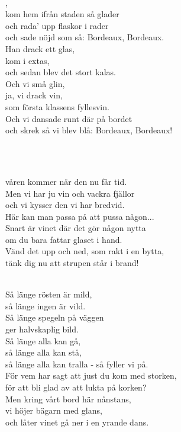 
 \\       

, \\
kom hem ifrån staden så glader \\
och rada' upp flaskor i rader \\
och sade nöjd som så: Bordeaux, Bordeaux. \\
Han drack ett glas, \\
kom i extas, \\
och sedan blev det stort kalas. \\
Och vi små glin, \\
ja, vi drack vin, \\
som första klassens fyllesvin. \\
Och vi dansade runt där på bordet \\
och skrek så vi blev blå: Bordeaux, Bordeaux! \\
 
\newpage

 \\       

 \\
våren kommer när den nu får tid. \\
Men vi har ju vin och vackra fjällor \\
och vi kysser den vi har bredvid. \\
Här kan man passa på att pussa någon... \\
Snart är vinet där det gör någon nytta \\
om du bara fattar glaset i hand. \\
Vänd det upp och ned, som rakt i en bytta, \\
tänk dig nu att strupen står i brand! \\



 \\       

\songtext{} 
Så länge rösten är mild, \\
så länge ingen är vild. \\
Så länge spegeln på väggen \\
ger halvskaplig bild. \\
Så länge alla kan gå, \\
så länge alla kan stå, \\
så länge alla kan tralla - så fyller vi på. \\
För vem har sagt att just du kom med storken, \\
för att bli glad av att lukta på korken? \\
Men kring vårt bord här nånstans, \\
vi höjer bägarn med glans, \\
och låter vinet gå ner i en yrande dans. \\


\newpage
